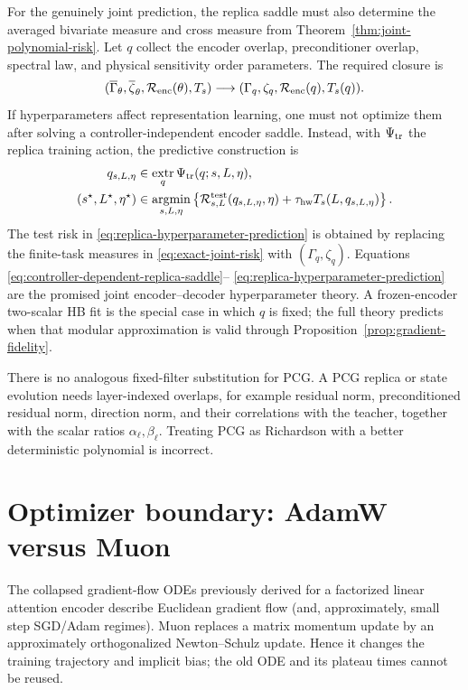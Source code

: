 \documentclass[11pt]{article}
\begin{document}
For the genuinely joint prediction, the replica saddle must also determine
the averaged bivariate measure and cross measure from
Theorem~\ref{thm:joint-polynomial-risk}.  Let $q$ collect the encoder overlap,
preconditioner overlap, spectral law, and physical sensitivity order
parameters.  The required closure is
\[
 (\overline\Gamma_\theta,\overline\zeta_\theta,
 \mathcal R_{\rm enc}(\theta),T_s)
 \longrightarrow
 (\Gamma_q,\zeta_q,\mathcal R_{\rm enc}(q),T_s(q)).
\]
If hyperparameters affect representation learning, one must not optimize them
after solving a controller-independent encoder saddle.  Instead, with
$\Psi_{\rm tr}$ the replica training action, the predictive construction is
\begin{align}
 q_{s,L,\eta}
 &\in\operatorname*{extr}_q
 \Psi_{\rm tr}(q;s,L,\eta),
 \label{eq:controller-dependent-replica-saddle}\\
 (s^\star,L^\star,\eta^\star)
 &\in\operatorname*{argmin}_{s,L,\eta}
 \left\{\mathcal R_{s,L}^{\rm test}
 (q_{s,L,\eta},\eta)+\tau_{\rm hw}T_s(L,q_{s,L,\eta})\right\}.
 \label{eq:replica-hyperparameter-prediction}
\end{align}
The test risk in \eqref{eq:replica-hyperparameter-prediction} is obtained by
replacing the finite-task measures in \eqref{eq:exact-joint-risk} with
$(\Gamma_q,\zeta_q)$.  Equations
\eqref{eq:controller-dependent-replica-saddle}--
\eqref{eq:replica-hyperparameter-prediction} are the promised joint
encoder--decoder hyperparameter theory.  A frozen-encoder two-scalar HB fit is
the special case in which $q$ is fixed; the full theory predicts when that
modular approximation is valid through Proposition~\ref{prop:gradient-fidelity}.

There is no analogous fixed-filter substitution for PCG.  A PCG replica or
state evolution needs layer-indexed overlaps, for example residual norm,
preconditioned residual norm, direction norm, and their correlations with the
teacher, together with the scalar ratios $\alpha_\ell,\beta_\ell$.  Treating
PCG as Richardson with a better deterministic polynomial is incorrect.

\section{Optimizer boundary: AdamW versus Muon}

The collapsed gradient-flow ODEs previously derived for a factorized linear
attention encoder describe Euclidean gradient flow (and, approximately, small
step SGD/Adam regimes).  Muon replaces a matrix momentum update by an
approximately orthogonalized Newton--Schulz update.  Hence it changes the
training trajectory and implicit bias; the old ODE and its plateau times
cannot be reused.
\end{document}
